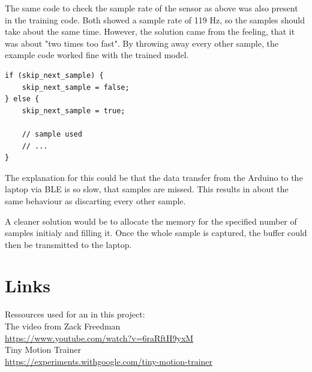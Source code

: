 \documentclass[a4paper,titlepage]{article}
\begin{document}
The same code to check the sample rate of the sensor as above was also present in the training code.
Both showed a sample rate of 119 Hz, so the samples should take about the same time.
However, the solution came from the feeling, that it was about "two times too fast".
By throwing away every other sample, the example code worked fine with the trained model.

\begin{lstlisting}
if (skip_next_sample) {
    skip_next_sample = false;
} else {
    skip_next_sample = true;

    // sample used
    // ...
}
\end{lstlisting}

The explanation for this could be that the data transfer from the Arduino to the laptop via BLE is so slow, that samples are missed.
This results in about the same behaviour as discarting every other sample.

A cleaner solution would be to allocate the memory for the specified number of samples initialy and filling it.
Once the whole sample is captured, the buffer could then be transmitted to the laptop.

\newpage
\section{Links}

Ressources used for an in this project: \\

The video from Zack Freedman \\
\href{https://www.youtube.com/watch?v=6raRftH9yxM}{https://www.youtube.com/watch?v=6raRftH9yxM} \\

Tiny Motion Trainer \\
\href{https://experiments.withgoogle.com/tiny-motion-trainer}{https://experiments.withgoogle.com/tiny-motion-trainer} \\
\end{document}

